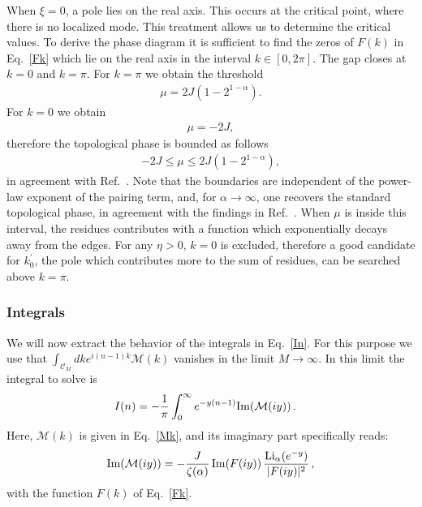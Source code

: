 \documentclass[pra,twocolumn,
superscriptaddress,
showpacs,
aps
]{revtex4-1}
\begin{document}
When $\xi=0$, a pole lies on the real axis. This occurs at the critical point, where there is no localized mode. This treatment allows us to determine the critical values.
To derive the phase diagram it is sufficient to find the zeros of $F(k)$ in Eq.~\eqref{Fk} which lie on the real axis in the interval $k\in[0,2\pi]$. The gap closes at $k=0$ and $k=\pi$. For $k=\pi$ we obtain the threshold
\begin{align}
\mu=2J\left(1-2^{1-\alpha}\right).
\end{align}
For $k=0$ we obtain 
\begin{align}
\mu=-2J,
\end{align}
therefore the topological phase is bounded as follows
\begin{align}
-2J\leq\mu\leq 2J\left(1-2^{1-\alpha}\right),
\label{Boundaries}
\end{align}
in agreement with Ref.~\cite{Alecce2017}. Note that the boundaries are independent of the power-law exponent of 
the pairing term, and, for $\alpha\to\infty$, one recovers the standard topological phase, in agreement with the 
findings in Ref.~\cite{Vodola2014,Vodola2016,Alecce2017}.
When $\mu$ is inside this interval, the residues contributes with a function which exponentially decays away from the edges. 
For any $\eta>0$, $k=0$ is excluded, therefore a good candidate for $k_0^\prime$, the pole which contributes more to the sum of residues, can be searched above $k=\pi$.

\subsubsection{Integrals}
We will now extract the behavior of the integrals in Eq.~\eqref{In}. For this purpose we use that $\int_{\mathcal{C}_M}dke^{i(n-1)k}{\mathcal M}(k)$ vanishes in the limit $M\to\infty$. In this limit 
the integral to solve is 
\begin{align}
I(n)&=-\frac{1}{\pi}\int_{0}^\infty e^{-y(n-1)}{\rm Im}({\mathcal M}(iy))\,.\label{Integral}
\end{align} 
Here, ${\mathcal M}(k)$ is given in Eq.~\eqref{Mk}, and its imaginary part specifically reads:
\begin{align}
\label{Mk:Im}
\mathrm{Im}({\mathcal M}(iy))=-\frac{J}{\zeta(\alpha)}\, {\rm Im}(F(iy))\,\frac{\mathrm{Li}_\alpha(e^{-y})}{|F(iy)|^2}\,,
\end{align}
with the function $F(k)$ of Eq.~\eqref{Fk}.
\end{document}
